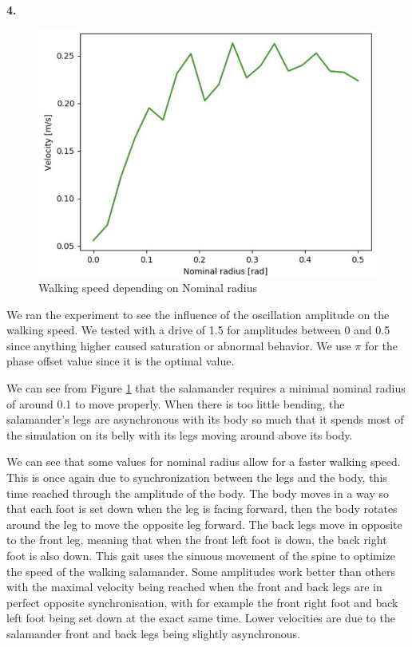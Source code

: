 \documentclass{cmc}
\begin{document}
\newpage
\textbf{4.} 
\begin{figure}[H]
\centering
\includegraphics[scale=0.5]{9f_4.JPG}
\caption{Walking speed depending on Nominal radius}
\label{fig:9f4}
\end{figure}

We ran the experiment to see the influence of the oscillation amplitude on the walking speed. We tested with a drive of 1.5 for amplitudes between 0 and 0.5 since anything higher caused saturation or abnormal behavior. We use $\pi$ for the phase offset value since it is the optimal value.

We can see from Figure \ref{fig:9f4} that the salamander requires a minimal nominal radius of around 0.1 to move properly. When there is too little bending, the salamander's legs are asynchronous with its body so much that it spends most of the simulation on its belly with its legs moving around above its body.

We can see that some values for nominal radius allow for a faster walking speed. This is once again due to synchronization between the legs and the body, this time reached through the amplitude of the body. The body moves in a way so that each foot is set down when the leg is facing forward, then the body rotates around the leg to move the opposite leg forward. The back legs move in opposite to the front leg, meaning that when the front left foot is down, the back right foot is also down. This gait uses the sinuous movement of the spine to optimize the speed of the walking salamander. Some amplitudes work better than others with the maximal velocity being reached when the front and back legs are in perfect opposite synchronisation, with for example the front right foot and back left foot being set down at the exact same time. Lower velocities are due to the salamander front and back legs being slightly asynchronous.
\end{document}
